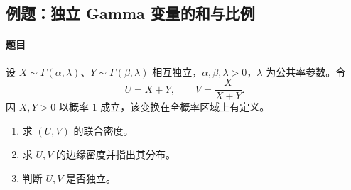 \subsection{例题：独立 Gamma 变量的和与比例}\label{note:c3:e19}
\paragraph{题目}
设 $X\sim\Gamma(\alpha,\lambda)$、$Y\sim\Gamma(\beta,\lambda)$ 相互独立，$\alpha,\beta,\lambda>0$，$\lambda$ 为公共率参数。令
\[
U=X+Y,\qquad V=\frac{X}{X+Y}.
\]
因 $X,Y>0$ 以概率 $1$ 成立，该变换在全概率区域上有定义。
\begin{enumerate}
\item 求 $(U,V)$ 的联合密度。

\item 求 $U,V$ 的边缘密度并指出其分布。

\item 判断 $U,V$ 是否独立。
\end{enumerate}

